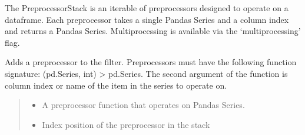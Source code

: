 \documentclass[letterpaper,10pt,english]{sphinxmanual}
\begin{document}
\begin{fulllineitems}
\label{\detokenize{preprocessor_stack:at_nlp.filters.preprocessor_stack.PreprocessorStack}}
\pysigstartsignatures
{}
\pysigstopsignatures
\sphinxAtStartPar
The PreprocessorStack is an iterable of preprocessors designed to operate on a dataframe. Each preprocessor
takes a single Pandas Series and a column index and returns a Pandas Series. Multiprocessing is available via the
‘multiprocessing’ flag.

\begin{fulllineitems}
\label{\detokenize{preprocessor_stack:at_nlp.filters.preprocessor_stack.PreprocessorStack.add}}
\pysigstartsignatures
{}
\pysigstopsignatures
\sphinxAtStartPar
Adds a preprocessor to the filter. Pre\sphinxhyphen{}processors must have the following
function signature: (pd.Series, int) \sphinxhyphen{}\textgreater{} pd.Series. The second argument of the
function is column index or name of the item in the series to operate on.
\begin{quote}\begin{description}
\begin{itemize}
\item {} 
\sphinxAtStartPar
{} \textendash{} A preprocessor function that operates on Pandas Series.

\item {} 
\sphinxAtStartPar
{} \textendash{} Index position of the preprocessor in the stack

\end{itemize}


\end{description}
\end{quote}
\end{fulllineitems}
\end{fulllineitems}
\end{document}

